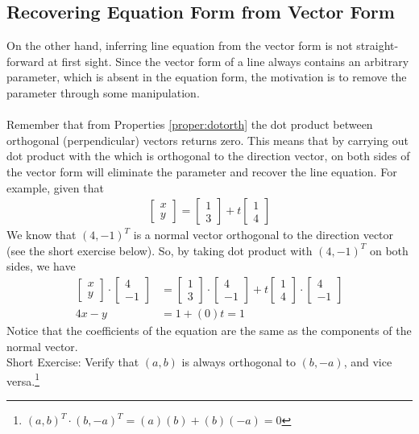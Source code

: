 \subsection{Recovering Equation Form from Vector Form} On the other hand, inferring line equation from the vector form is not straight-forward at first sight. Since the vector form of a line always contains an arbitrary parameter, which is absent in the equation form, the motivation is to remove the parameter through some manipulation.\\
\\
Remember that from Properties \ref{proper:dotorth} the dot product between orthogonal (perpendicular) vectors returns zero. This means that by carrying out dot product with the  which is orthogonal to the direction vector, on both sides of the vector form will eliminate the parameter and recover the line equation. For example, given that
\begin{align*}
\begin{bmatrix}
x\\
y
\end{bmatrix}
=
\begin{bmatrix}
1\\
3
\end{bmatrix}
+ t
\begin{bmatrix}
1 \\
4
\end{bmatrix} 
\end{align*}
We know that $(4, -1)^T$ is a normal vector orthogonal to the direction vector (see the short exercise below). So, by taking dot product with $(4, -1)^T$ on both sides, we have
\begin{align*}
\begin{bmatrix}
x\\
y
\end{bmatrix}
\cdot
\begin{bmatrix}
4\\
-1
\end{bmatrix}
&=
\begin{bmatrix}
1\\
3
\end{bmatrix}
\cdot
\begin{bmatrix}
4\\
-1
\end{bmatrix}
+ t
\begin{bmatrix}
1 \\
4
\end{bmatrix} 
\cdot
\begin{bmatrix}
4\\
-1
\end{bmatrix}\\
4x - y &= 1 + (0)t = 1
\end{align*}
Notice that the coefficients of the equation are the same as the components of the normal vector.\\
Short Exercise: Verify that $(a, b)$ is always orthogonal to $(b, -a)$, and vice versa.\footnote{$(a, b)^T \cdot (b, -a)^T = (a)(b) + (b)(-a) = 0$}

